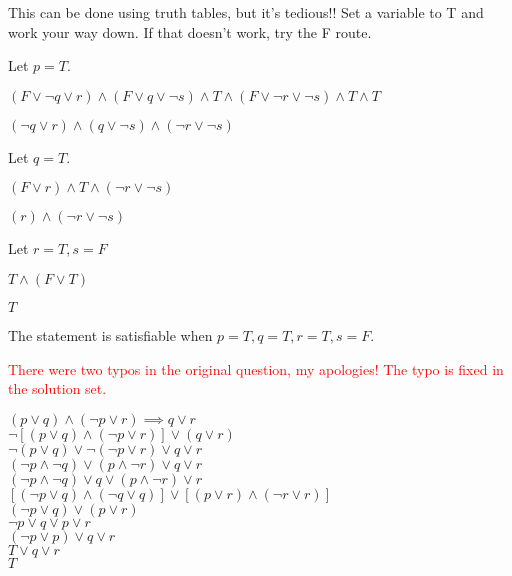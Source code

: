\documentclass{exam}
\begin{document}
\begin{questions}
\begin{subparts}
\end{subparts}


\begin{center}
This can be done using truth tables, but it's tedious!! Set a variable to T and work your way down. If that doesn't work, try the F route.

Let \(p = T\).

\( (F \lor \neg q \lor r) \land (F \lor q \lor \neg s) \land T \land (F \lor \neg r \lor \neg s) \land T \land T \)

\( (\neg q \lor r) \land (q \lor \neg s) \land (\neg r \lor \neg s) \)

Let \(q = T\).

\( (F \lor r) \land T \land (\neg r \lor \neg s) \)

\( (r) \land (\neg r \lor \neg s) \)

Let \(r = T, s = F\)

\( T \land (F \lor T) \)

\( T \)

The statement is satisfiable when \( p = T, q = T, r = T, s = F \).

\end{center}

\newpage


\begin{center}

\textcolor{red}{There were two typos in the original question, my apologies! The typo is fixed in the solution set.}

\(  (p \lor q) \land (\neg p \lor r) \implies q \lor r \)\\
\(  \neg[(p \lor q) \land (\neg p \lor r)] \lor (q \lor r) \)\\
\(  \neg(p \lor q) \lor \neg(\neg p \lor r) \lor q \lor r \)\\
\(  (\neg p \land \neg q) \lor ( p \land \neg r) \lor q \lor r \)\\
\(  (\neg p \land \neg q) \lor q \lor ( p \land \neg r) \lor r \)\\
\(  [ (\neg p \lor q) \land (\neg q \lor q) ] \lor [ (p \lor r) \land (\neg r \lor r) ] \)\\
\(  (\neg p \lor q) \lor (p \lor r) \)\\
\(  \neg p \lor q \lor p \lor r \)\\
\(  (\neg p \lor p) \lor q \lor r \)\\
\(  T \lor q \lor r \)\\
\(  T \)\\


\end{center}
\end{questions}
\end{document}
